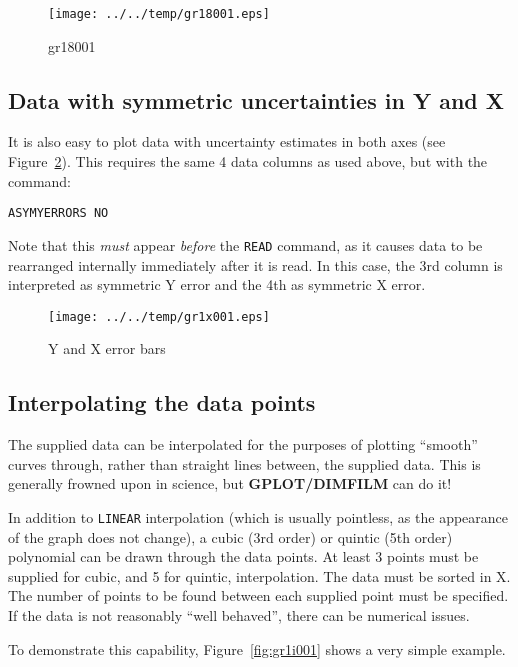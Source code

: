 \documentclass[a4paper,twoside,11pt]{article}
\makeatletter
\def\maxwidth{%
  \ifdim\Gin@nat@width>\linewidth
    \linewidth
  \else
    \Gin@nat@width
  \fi
}
\newcommand{\newpara}{\par\vspace{4mm}\noindent}
\makeatother
\begin{document}
\begin{figure}
  \centering
  \texttt{[image: ../../temp/gr18001.eps]}
  \caption{gr18001}
  \label{fig:gr18001}
\end{figure}


\subsection{Data with symmetric uncertainties in Y and X}\label{data-with-symmetric-uncertainties-in-y-and-x}
\newpara
It is also easy to plot data with uncertainty estimates in both axes
(see Figure~\ref{fig:gr1x001}).
This requires the same 4 data columns as used above, but with the
command:

\begin{lstlisting}
ASYMYERRORS NO
\end{lstlisting}

\newpara
Note that this \emph{must} appear \emph{before} the \texttt{READ}
command, as it causes data to be rearranged internally immediately after
it is read. In this case, the 3rd column is interpreted as symmetric Y
error and the 4th as symmetric X error.

\begin{figure}
  \centering
  \texttt{[image: ../../temp/gr1x001.eps]}
  \caption{Y and X error bars}
  \label{fig:gr1x001}
\end{figure}


\subsection{Interpolating the data points}\label{interpolating-the-data-points}
\newpara
The supplied data can be interpolated for the purposes of plotting
``smooth'' curves through, rather than straight lines between, the
supplied data. This is generally frowned upon in science, but
\textbf{GPLOT/DIMFILM} can do it!

\newpara
In addition to \texttt{LINEAR} interpolation (which is usually
pointless, as the appearance of the graph does not change), a cubic (3rd
order) or quintic (5th order) polynomial can be drawn through the data
points. At least 3 points must be supplied for cubic, and 5 for quintic,
interpolation. The data must be sorted in X. The number of points to be
found between each supplied point must be specified. If the data is not
reasonably ``well behaved'', there can be numerical issues.

\newpara
To demonstrate this capability, Figure~\ref{fig:gr1i001} shows a very simple example.
\end{document}
